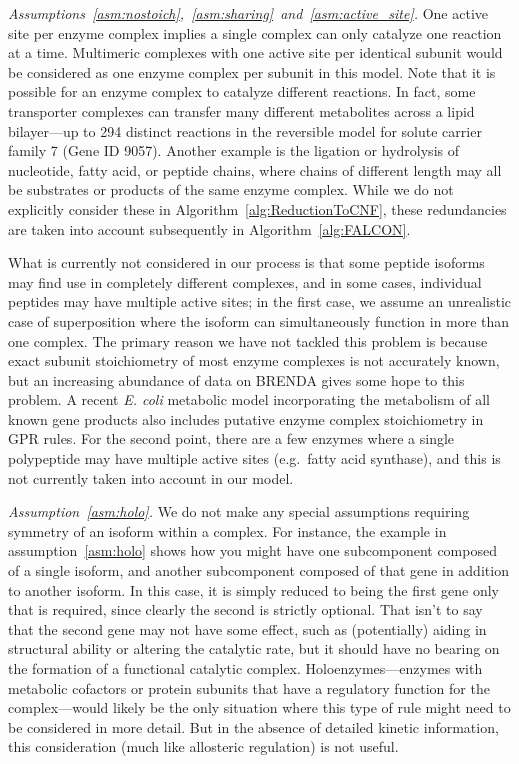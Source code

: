 \emph{Assumptions~\ref{asm:nostoich},~\ref{asm:sharing}~and~\ref{asm:active_site}.}
One active site per enzyme complex implies a single complex can only
catalyze one reaction at a time. Multimeric complexes with one active
site per identical subunit would be considered as one enzyme complex
per subunit in this model. Note that it is possible for an enzyme
complex to catalyze different reactions. In fact, some transporter
complexes can transfer many different metabolites across a lipid
bilayer---up to 294 distinct reactions in the reversible model for
solute carrier family 7 (Gene ID 9057).  Another example is the
ligation or hydrolysis of nucleotide, fatty acid, or peptide chains,
where chains of different length may all be substrates or products of
the same enzyme complex. While we do not explicitly consider these in
Algorithm~\ref{alg:ReductionToCNF}, these redundancies are taken into
account subsequently in Algorithm~\ref{alg:FALCON}.

What is currently not considered in our process is that some peptide
isoforms may find use in completely different complexes, and in some
cases, individual peptides may have multiple active sites; in the
first case, we assume an unrealistic case of superposition where the
isoform can simultaneously function in more than one complex. The
primary reason we have not tackled this problem is because exact
subunit stoichiometry of most enzyme complexes is not accurately
known, but an increasing abundance of data on BRENDA
\citep{Schomburg2013} gives some hope to this problem. A recent
\textit{E. coli} metabolic model incorporating the metabolism of all
known gene products \citep{O'Brien2013} also includes putative
enzyme complex stoichiometry in GPR rules. For the second point, there
are a few enzymes where a single polypeptide may have multiple active
sites (e.g.\ fatty acid synthase), and this is not currently taken into
account in our model. 

\emph{Assumption~\ref{asm:holo}.}
We do not make any special assumptions requiring symmetry of an
isoform within a complex. For instance, the example in
assumption~\ref{asm:holo} shows how you might have one subcomponent
composed of a single isoform, and another subcomponent composed of
that gene in addition to another isoform. In this case, it is simply
reduced to being the first gene only that is required, since clearly
the second is strictly optional. That isn't to say that the second
gene may not have some effect, such as (potentially) aiding in
structural ability or altering the catalytic rate, but it should have
no bearing on the formation of a functional catalytic
complex. Holoenzymes---enzymes with metabolic cofactors or protein
subunits that have a regulatory function for the complex---would
likely be the only situation where this type of rule might need to be
considered in more detail. But in the absence of detailed kinetic
information, this consideration (much like allosteric
regulation) is not useful.

